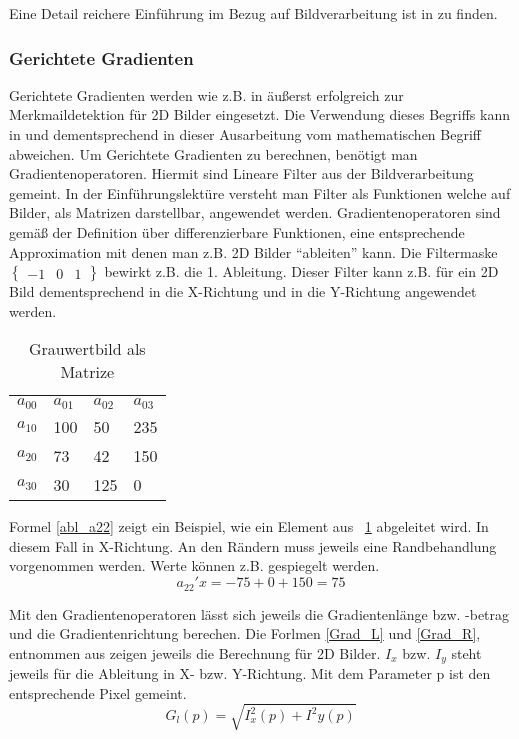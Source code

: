 Eine Detail reichere Einführung im Bezug auf Bildverarbeitung ist in \cite{Priese15} zu finden.

\subsubsection{Gerichtete Gradienten}
Gerichtete Gradienten werden wie z.B. in \cite{dalal2005histograms} äußerst erfolgreich zur Merkmaildetektion für 2D Bilder eingesetzt. Die Verwendung dieses Begriffs kann in \cite{scherer2010histograms} und dementsprechend in dieser Ausarbeitung vom mathematischen Begriff abweichen.
\newline
Um Gerichtete Gradienten zu berechnen, benötigt man Gradientenoperatoren. Hiermit sind Lineare Filter aus der Bildverarbeitung gemeint. In der Einführungslektüre \cite{Priese15} versteht man Filter als Funktionen welche auf Bilder, als Matrizen darstellbar, angewendet werden. Gradientenoperatoren sind gemäß der Definition über differenzierbare Funktionen, eine entsprechende Approximation mit denen man z.B. 2D Bilder "`ableiten"' kann. Die Filtermaske 
$
\begin{Bmatrix}
-1 & 0 & 1
\end{Bmatrix}
$
bewirkt z.B. die 1. Ableitung. Dieser Filter kann z.B. für ein 2D Bild dementsprechend in die X-Richtung und in die Y-Richtung angewendet werden. 

\begin{table}[]
	\centering
	\caption{Grauwertbild als Matrize}
	\label{GrauwertMat}
	\begin{tabular}{llll}
		$a_{00}$ & $a_{01}$ & $a_{02}$ & $a_{03}$ \\
		$a_{10}$ & 100    & 50     & 235     \\
		$a_{20}$ & 73     & 42     & 150      \\
		$a_{30}$ & 30     & 125    & 0                     
	\end{tabular}
\end{table}

Formel \ref{abl_a22} zeigt ein Beispiel, wie ein Element aus \tablename~\ref{GrauwertMat} abgeleitet wird. In diesem Fall in X-Richtung. An den Rändern muss jeweils eine Randbehandlung vorgenommen werden. Werte können z.B. gespiegelt werden.
\begin{equation}
\label{abl_a22}
a_{22}'x = -75 + 0 +150 = 75
\end{equation}

Mit den Gradientenoperatoren lässt sich jeweils die Gradientenlänge bzw. -betrag und die Gradientenrichtung berechen. Die Forlmen \ref{Grad_L} und \ref{Grad_R}, entnommen aus \cite{Priese15} zeigen jeweils die Berechnung für 2D Bilder. $I_x$ bzw. $I_y$ steht jeweils für die Ableitung in X- bzw. Y-Richtung. Mit dem Parameter p ist den entsprechende Pixel gemeint.
\begin{equation}
\label{Grad_L}
G_l(p) = \sqrt{I^2_x(p)+ I^2 y(p)}
\end{equation}

